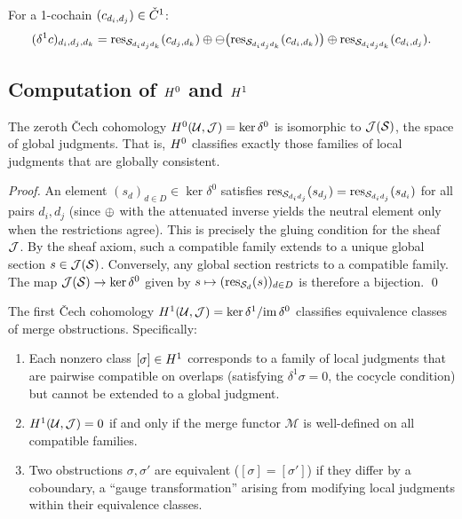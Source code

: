 \documentclass[11pt]{article}
\newcommand{\MergeFun}{\mathcal{M}}
\begin{document}
For a 1-cochain $(c_{d_i, d_j}) \in \check{C}^1$:
\[
  (\delta^1 c)_{d_i, d_j, d_k} =
  \mathrm{res}_{\mathcal{S}_{d_i d_j d_k}}(c_{d_j, d_k})
  \oplus \ominus\bigl(\mathrm{res}_{\mathcal{S}_{d_i d_j d_k}}(c_{d_i, d_k})\bigr)
  \oplus \mathrm{res}_{\mathcal{S}_{d_i d_j d_k}}(c_{d_i, d_j}).
\]

\subsection{Computation of $H^{0}$ and $H^{1}$}

\begin{theorem}\label{thm:h0}
The zeroth \v{C}ech cohomology
$H^{0}(\mathcal{U}, \mathcal{J}) = \ker \delta^0$ is isomorphic to
$\mathcal{J}(\mathcal{S})$, the space of global judgments. That is, $H^{0}$ classifies
exactly those families of local judgments that are globally consistent.
\end{theorem}

\begin{proof}
An element $(s_d)_{d \in D} \in \ker \delta^0$ satisfies
$\mathrm{res}_{\mathcal{S}_{d_i d_j}}(s_{d_j}) = \mathrm{res}_{\mathcal{S}_{d_i d_j}}(s_{d_i})$ for all
pairs $d_i, d_j$ (since $\oplus$ with the attenuated inverse yields the neutral
element only when the restrictions agree). This is precisely the gluing
condition for the sheaf $\mathcal{J}$. By the sheaf axiom, such a compatible family
extends to a unique global section $s \in \mathcal{J}(\mathcal{S})$. Conversely, any global
section restricts to a compatible family. The map
$\mathcal{J}(\mathcal{S}) \to \ker \delta^0$ given by $s \mapsto (\mathrm{res}_{\mathcal{S}_d}(s))_{d \in D}$
is therefore a bijection. \qed
\end{proof}

\begin{theorem}\label{thm:h1}
The first \v{C}ech cohomology
$H^{1}(\mathcal{U}, \mathcal{J}) = \ker \delta^1 / \mathrm{im}\,\delta^0$ classifies
equivalence classes of merge obstructions. Specifically:
\begin{enumerate}
  \item Each nonzero class $[\sigma] \in H^{1}$ corresponds to a family of
        local judgments that are pairwise compatible on overlaps (satisfying
        $\delta^1 \sigma = 0$, the cocycle condition) but cannot be extended to
        a global judgment.
  \item $H^{1}(\mathcal{U}, \mathcal{J}) = 0$ if and only if the merge functor
        $\MergeFun$ is well-defined on all compatible families.
  \item Two obstructions $\sigma, \sigma'$ are equivalent ($[\sigma] = [\sigma']$)
        if they differ by a coboundary, \ie a ``gauge transformation'' arising from
        modifying local judgments within their equivalence classes.
\end{enumerate}
\end{theorem}
\end{document}
